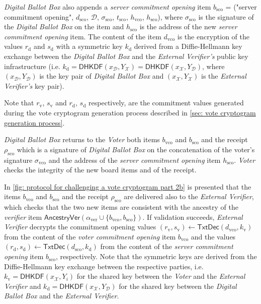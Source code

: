 \textit{Digital Ballot Box} also appends a \textit{server commitment opening} item $b_\mathrm{sco}$ = ("server commitment opening", $d_\mathrm{sco}$, $\mathcal{D}$, $\sigma_\mathrm{sco}$, $t_\mathrm{sco}$, $h_\mathrm{vco}$, $h_\mathrm{sco}$), where $\sigma_\mathrm{sco}$ is the signature of the \textit{Digital Ballot Box} on the item and $h_\mathrm{sco}$ is the address of the new \textit{server commitment opening} item. The content of the item $d_\mathrm{vco}$ is the encryption of the values $r_\mathrm{d}$ and $s_\mathrm{d}$ with a symmetric key $k_\mathrm{d}$ derived from a Diffie-Hellmann key exchange between the \textit{Digital Ballot Box} and the \textit{External Verifier's} public key infrastructure (i.e. $k_\mathrm{d} = \mathsf{DHKDF}(x_\mathcal{D}, Y_\mathcal{X}) = \mathsf{DHKDF}(x_\mathcal{X}, Y_\mathcal{D})$, where $(x_\mathcal{D}, Y_\mathcal{D})$ is the key pair of \textit{Digital Ballot Box} and $(x_\mathcal{X}, Y_\mathcal{X})$ is the \textit{External Verifier's} key pair). 

Note that $r_\mathrm{v}$, $s_\mathrm{v}$ and $r_\mathrm{d}$, $s_\mathrm{d}$ respectively, are the commitment values generated during the vote cryptogram generation process described in \cref{sec: vote cryptogram generation process}.

\textit{Digital Ballot Box} returns to the \textit{Voter} both items $b_\mathrm{vco}$ and $b_\mathrm{sco}$ and the receipt $\rho_\mathrm{sco}$ which is a signature of \textit{Digital Ballot Box} on the concatenation of the voter's signature $\sigma_\mathrm{vco}$ and the address of the \textit{server commitment opening} item $h_\mathrm{sco}$. \textit{Voter} checks the integrity of the new board items and of the receipt.

In \cref{fig: protocol for challenging a vote cryptogram part 2b} is presented that the items $b_\mathrm{vco}$ and $b_\mathrm{sco}$ and the receipt $\rho_\mathrm{sco}$ are delivered also to the \textit{External Verifier}, which checks that the two new items are consistent with the ancestry of the \textit{verifier} item $\mathsf{AncestryVer}(\alpha_\mathrm{ver} \cup \{ b_\mathrm{vco}, b_\mathrm{sco} \})$. If validation succeeds, \textit{External Verifier} decrypts the commitment opening values $(r_\mathrm{v}, s_\mathrm{v}) \gets \mathsf{TxtDec}(d_\mathrm{vco}, k_\mathrm{v})$ from the content of the \textit{voter commitment opening} item $b_\mathrm{vco}$ and the values $(r_\mathrm{d}, s_\mathrm{d}) \gets \mathsf{TxtDec}(d_\mathrm{sco}, k_\mathrm{d})$ from the content of the \textit{server commitment opening} item $b_\mathrm{sco}$, respectively. Note that the symmetric keys are derived from the Diffie-Hellmann key exchange between the respective parties, i.e. $k_\mathrm{v} = \mathsf{DHKDF}(x_\mathcal{X}, Y_i)$ for the shared key between the \textit{Voter} and the \textit{External Verifier} and $k_\mathrm{d} = \mathsf{DHKDF}(x_\mathcal{X}, Y_\mathcal{D})$ for the shared key between the \textit{Digital Ballot Box} and the \textit{External Verifier}.

